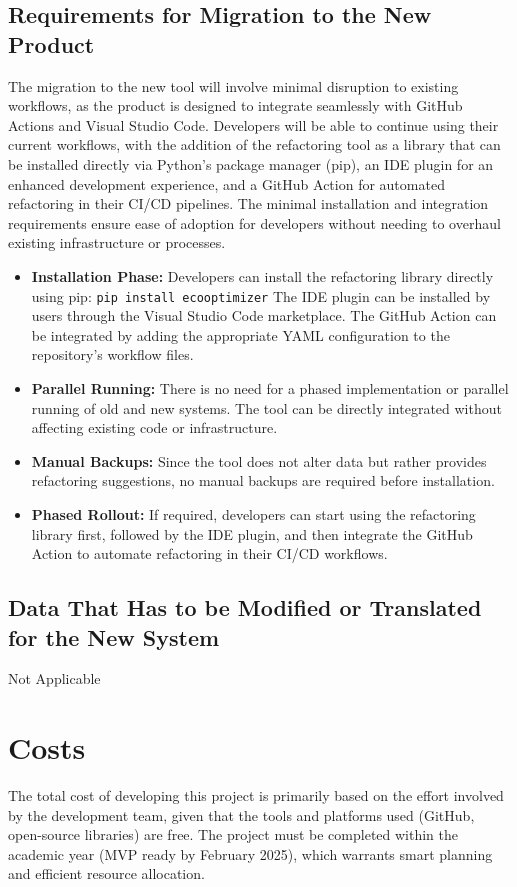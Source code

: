 \documentclass[12pt]{article}
\begin{document}
\subsection{Requirements for Migration to the New Product}
The migration to the new tool will involve minimal disruption to existing workflows, as the product is designed to integrate seamlessly with GitHub Actions and Visual Studio Code. Developers will be able to continue using their current workflows, with the addition of the refactoring tool as a library that can be installed directly via Python's package manager (pip), an IDE plugin for an enhanced development experience, and a GitHub Action for automated refactoring in their CI/CD pipelines. The minimal installation and integration requirements ensure ease of adoption for developers without needing to overhaul existing infrastructure or processes.
\begin{itemize}
    \item \textbf{Installation Phase:} 
    Developers can install the refactoring library directly using pip:
    \verb|pip install ecooptimizer|
    The IDE plugin can be installed by users through the Visual Studio Code marketplace. The GitHub Action can be integrated by adding the appropriate YAML configuration to the repository's workflow files.
    \item \textbf{Parallel Running:} 
    There is no need for a phased implementation or parallel running of old and new systems. The tool can be directly integrated without affecting existing code or infrastructure.
    \item \textbf{Manual Backups:} 
    Since the tool does not alter data but rather provides refactoring suggestions, no manual backups are required before installation.
    \item \textbf{Phased Rollout:} 
    If required, developers can start using the refactoring library first, followed by the IDE plugin, and then integrate the GitHub Action to automate refactoring in their CI/CD workflows.
\end{itemize}
\subsection{Data That Has to be Modified or Translated for the New System}
Not Applicable

\section{Costs}
The total cost of developing this project is primarily based on the effort involved by the development team, given that the tools and platforms used (GitHub, open-source libraries) are free. The project must be completed within the academic year (MVP ready by February 2025), which warrants smart planning and efficient resource allocation.
\end{document}
